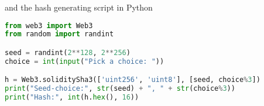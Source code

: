 \documentclass{article}
\begin{document}
    \noindent and the hash generating script in Python
    \begin{lstlisting}[language=Python]
from web3 import Web3
from random import randint

seed = randint(2**128, 2**256)
choice = int(input("Pick a choice: "))

h = Web3.soliditySha3(['uint256', 'uint8'], [seed, choice%3])
print("Seed-choice:", str(seed) + ", " + str(choice%3))
print("Hash:", int(h.hex(), 16))
    \end{lstlisting}
\end{document}
